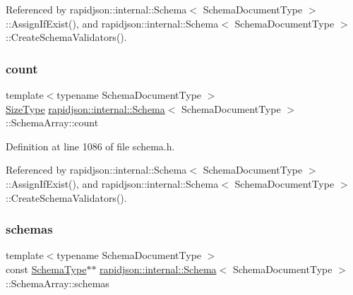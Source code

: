 Referenced by rapidjson\+::internal\+::\+Schema$<$ Schema\+Document\+Type $>$\+::\+Assign\+If\+Exist(), and rapidjson\+::internal\+::\+Schema$<$ Schema\+Document\+Type $>$\+::\+Create\+Schema\+Validators().

\mbox{\label{structrapidjson_1_1internal_1_1_schema_1_1_schema_array_aab9d520fb9a18f44ecc9672778768dfe}} 
\subsubsection{\texorpdfstring{count}{count}}
{\footnotesize\ttfamily template$<$typename Schema\+Document\+Type $>$ \\
\mbox{\hyperlink{namespacerapidjson_a44eb33eaa523e36d466b1ced64b85c84}{Size\+Type}} \mbox{\hyperlink{classrapidjson_1_1internal_1_1_schema}{rapidjson\+::internal\+::\+Schema}}$<$ Schema\+Document\+Type $>$\+::Schema\+Array\+::count}



Definition at line 1086 of file schema.\+h.



Referenced by rapidjson\+::internal\+::\+Schema$<$ Schema\+Document\+Type $>$\+::\+Assign\+If\+Exist(), and rapidjson\+::internal\+::\+Schema$<$ Schema\+Document\+Type $>$\+::\+Create\+Schema\+Validators().

\mbox{\label{structrapidjson_1_1internal_1_1_schema_1_1_schema_array_a7dbfb5fabd5ac32573172d2295be7012}} 
\subsubsection{\texorpdfstring{schemas}{schemas}}
{\footnotesize\ttfamily template$<$typename Schema\+Document\+Type $>$ \\
const \mbox{\hyperlink{classrapidjson_1_1internal_1_1_schema_a62e03be17971648a9d614244ffcb0f10}{Schema\+Type}}$\ast$$\ast$ \mbox{\hyperlink{classrapidjson_1_1internal_1_1_schema}{rapidjson\+::internal\+::\+Schema}}$<$ Schema\+Document\+Type $>$\+::Schema\+Array\+::schemas}



